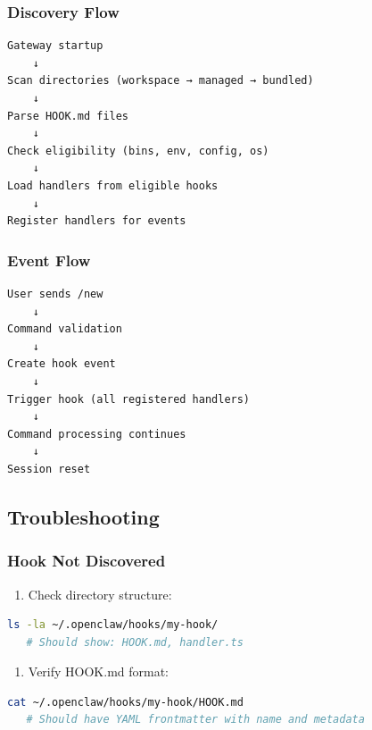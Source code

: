 \subsubsection{Discovery Flow}


\begin{lstlisting}
Gateway startup
    ↓
Scan directories (workspace → managed → bundled)
    ↓
Parse HOOK.md files
    ↓
Check eligibility (bins, env, config, os)
    ↓
Load handlers from eligible hooks
    ↓
Register handlers for events
\end{lstlisting}


\subsubsection{Event Flow}


\begin{lstlisting}
User sends /new
    ↓
Command validation
    ↓
Create hook event
    ↓
Trigger hook (all registered handlers)
    ↓
Command processing continues
    ↓
Session reset
\end{lstlisting}


\subsection{Troubleshooting}


\subsubsection{Hook Not Discovered}


\begin{enumerate}
  \item Check directory structure:
\end{enumerate}


\begin{lstlisting}[language=bash]
   ls -la ~/.openclaw/hooks/my-hook/
   # Should show: HOOK.md, handler.ts
\end{lstlisting}


\begin{enumerate}
  \item Verify HOOK.md format:
\end{enumerate}


\begin{lstlisting}[language=bash]
   cat ~/.openclaw/hooks/my-hook/HOOK.md
   # Should have YAML frontmatter with name and metadata
\end{lstlisting}


